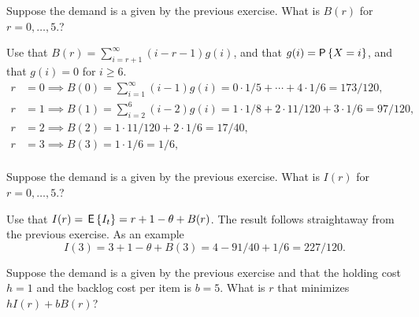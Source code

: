 \begin{question}
Suppose the demand is a given by the previous exercise. What is $B(r)$ for $r=0,\ldots, 5$.?
\end{question}
\begin{solution}
  Use that $B(r) = \sum_{i=r+1}^\infty (i-r-1)g(i)$, and that $g(i) = \P{X = i}$, and that $g(i)=0$ for $i\geq 6$.
  \begin{align*}
    r&=0 \implies B(0) = \sum_{i=1}^\infty (i-1)g(i) =  0\cdot 1/5 + \cdots + 4 \cdot 1/6 = 173/120, \\
    r&=1 \implies B(1) = \sum_{i=2}^6 (i-2)g(i) =  1\cdot 1/8 + 2\cdot 11/120 + 3 \cdot 1/6 = 97/120, \\
    r&=2 \implies B(2) = 1\cdot 11/120 + 2 \cdot 1/6 = 17/40, \\
    r&=3 \implies B(3) = 1 \cdot 1/6 = 1/6, \\
  \end{align*}
\end{solution}

\begin{question}
Suppose the demand is a given by the previous exercise. What is $I(r)$ for $r=0,\ldots, 5$.?
\end{question}
\begin{solution}
  Use that $I(r) = \,\mathsf{E}\left\{I_t\right\} = r+1-\theta + B(r)$.  The result follows straightaway from the previous exercise. As an example
  \begin{equation*}
    I(3) = 3+1 - \theta + B(3) = 4 - 91/40 + 1/6 = 227/120.
  \end{equation*}
\end{solution}

\begin{question}
Suppose the demand is a given by the previous exercise and that the holding cost $h=1$ and the backlog cost per item is $b=5$.  What is $r$ that minimizes $hI(r)+bB(r)$?
\end{question}


